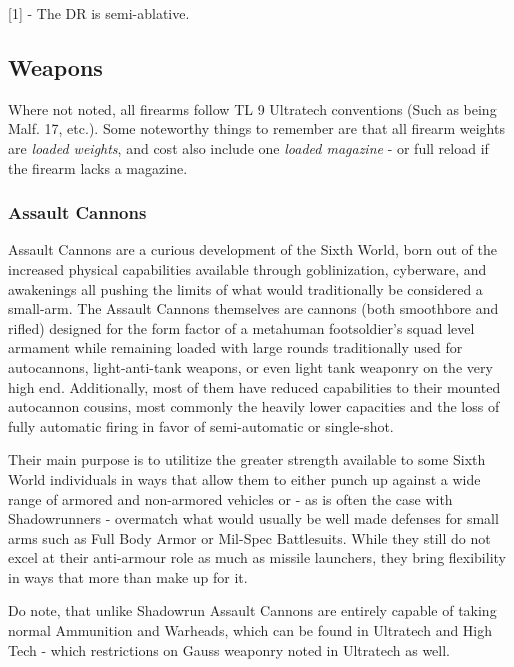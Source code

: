 [1] - The DR is semi-ablative.

\subsection{Weapons}

Where not noted, all firearms follow TL 9 Ultratech conventions (Such as being Malf. 17, etc.). Some noteworthy things to remember are that all firearm weights are \textit{loaded weights}, and cost also include one \textit{loaded magazine} - or full reload if the firearm lacks a magazine.

\subsubsection{Assault Cannons}

Assault Cannons are a curious development of the Sixth World, born out of the increased physical capabilities available through goblinization, cyberware, and awakenings all pushing the limits of what would traditionally be considered a small-arm. The Assault Cannons themselves are cannons (both smoothbore and rifled) designed for the form factor of a metahuman footsoldier's squad level armament while remaining loaded with large rounds traditionally used for autocannons, light-anti-tank weapons, or even light tank weaponry on the very high end. Additionally, most of them have reduced capabilities to their mounted autocannon cousins, most commonly the heavily lower capacities and the loss of fully automatic firing in favor of semi-automatic or single-shot.

Their main purpose is to utilitize the greater strength available to some Sixth World individuals in ways that allow them to either punch up against a wide range of armored and non-armored vehicles or - as is often the case with Shadowrunners - overmatch what would usually be well made defenses for small arms such as Full Body Armor or Mil-Spec Battlesuits. While they still do not excel at their anti-armour role as much as missile launchers, they bring flexibility in ways that more than make up for it.

Do note, that unlike Shadowrun Assault Cannons are entirely capable of taking normal Ammunition and Warheads, which can be found in Ultratech and High Tech - which restrictions on Gauss weaponry noted in Ultratech as well.

